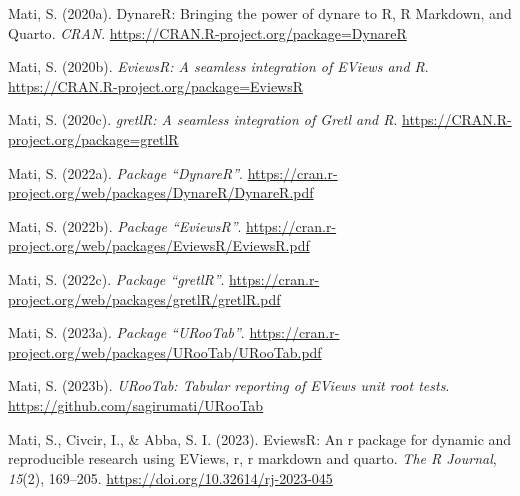 \documentclass[
  letterpaper,
  DIV=11,
  numbers=noendperiod]{scrartcl}
\newlength{\cslhangindent}
\newlength{\cslentryspacingunit} %
\newenvironment{CSLReferences}[2] %
 {%
  \setlength{\parindent}{0pt}
  \ifodd #1
  \let\oldpar\par
  \def\par{\hangindent=\cslhangindent\oldpar}
  \fi
  \setlength{\parskip}{#2\cslentryspacingunit}
 }%
 {}
\begin{document}
\hypertarget{refs}{}
\begin{CSLReferences}{1}{0}
\leavevmode{}%
Mati, S. (2020a). DynareR: Bringing the power of dynare to {R, R
Markdown, and Quarto}. \emph{CRAN}.
\url{https://CRAN.R-project.org/package=DynareR}

\leavevmode{}%
Mati, S. (2020b). \emph{EviewsR: A seamless integration of {EViews} and
{R}}. \url{https://CRAN.R-project.org/package=EviewsR}

\leavevmode{}%
Mati, S. (2020c). \emph{gretlR: A seamless integration of {Gretl} and
{R}}. \url{https://CRAN.R-project.org/package=gretlR}

\leavevmode{}%
Mati, S. (2022a). \emph{Package {``DynareR''}}.
\url{https://cran.r-project.org/web/packages/DynareR/DynareR.pdf}

\leavevmode{}%
Mati, S. (2022b). \emph{Package {``EviewsR''}}.
\url{https://cran.r-project.org/web/packages/EviewsR/EviewsR.pdf}

\leavevmode{}%
Mati, S. (2022c). \emph{Package {``gretlR''}}.
\url{https://cran.r-project.org/web/packages/gretlR/gretlR.pdf}

\leavevmode{}%
Mati, S. (2023a). \emph{Package {``URooTab''}}.
\url{https://cran.r-project.org/web/packages/URooTab/URooTab.pdf}

\leavevmode{}%
Mati, S. (2023b). \emph{{URooTab}: Tabular reporting of {EViews} unit
root tests}. \url{https://github.com/sagirumati/URooTab}

\leavevmode{}%
Mati, S., Civcir, I., \& Abba, S. I. (2023). {EviewsR}: An r package for
dynamic and reproducible research using {EViews}, r, r markdown and
quarto. \emph{The R Journal}, \emph{15}(2), 169--205.
\url{https://doi.org/10.32614/rj-2023-045}

\end{CSLReferences}
\end{document}
